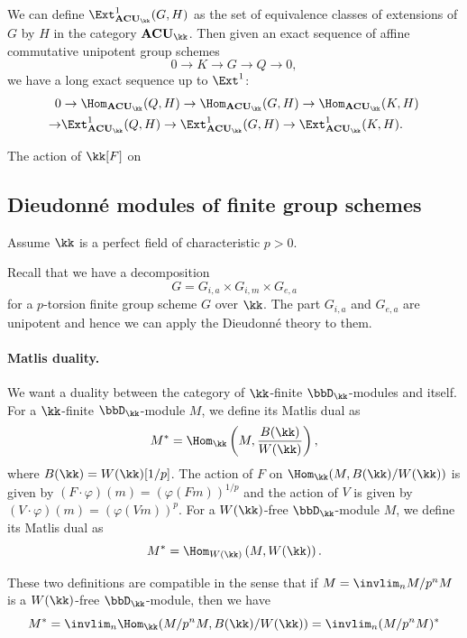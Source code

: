 \begin{remark}\label{rmk:define-Ext1}
	We can define $\Ext^1_{\mathbf{ACU}_\kk}(G, H)$ as the set of equivalence classes of extensions of $G$ by $H$ in the category $\mathbf{ACU}_\kk$.
	Then given an exact sequence of affine commutative unipotent group schemes
	\[ 0 \to K \to G \to Q \to 0, \]
	we have a long exact sequence up to $\Ext^1$:
	\begin{align*}
		0   & \to \Hom_{\mathbf{ACU}_\kk}(Q, H) \to \Hom_{\mathbf{ACU}_\kk}(G, H) \to \Hom_{\mathbf{ACU}_\kk}(K, H)    \\
		\to & \Ext^1_{\mathbf{ACU}_\kk}(Q, H) \to \Ext^1_{\mathbf{ACU}_\kk}(G, H) \to \Ext^1_{\mathbf{ACU}_\kk}(K, H).
	\end{align*}
\end{remark}

\begin{lemma}
	The action of $\kk[F]$ on \Yang{}
\end{lemma}



\subsection{Dieudonn\'e modules of finite group schemes}

Assume $\kk$ is a perfect field of characteristic $p>0$.

Recall that we have a decomposition
\[ G = G_{i,a} \times G_{i,m} \times G_{e,a} \]
for a $p$-torsion finite group scheme $G$ over $\kk$.
The part $G_{i,a}$ and $G_{e,a}$ are unipotent and hence we can apply the Dieudonn\'e theory to them.

\paragraph{Matlis duality.}
We want a duality between the category of $\kk$-finite $\bbD_\kk$-modules and itself.
For a $\kk$-finite $\bbD_\kk$-module $M$, we define its Matlis dual as
\[ M^* =  \Hom_\kk\left(M, \frac{B(\kk)}{W(\kk)}\right), \]
where $B(\kk) = W(\kk)[1/p]$.
The action of $F$ on $\Hom_\kk(M, B(\kk)/W(\kk))$ is given by $(F \cdot \varphi)(m) = \left( \varphi(Fm) \right)^{1/p}$ and the action of $V$ is given by $(V \cdot \varphi)(m) = \left( \varphi(Vm) \right)^p$.
For a $W(\kk)$-free $\bbD_\kk$-module $M$, we define its Matlis dual as
\[ M^* =  \Hom_{W(\kk)}\left(M, W(\kk)\right). \]

These two definitions are compatible in the sense that if $M = \invlim_n M/p^n M$ is a $W(\kk)$-free $\bbD_\kk$-module, then we have
\[ M^* = \invlim_n \Hom_\kk(M/p^n M, B(\kk)/W(\kk)) = \invlim_n (M/p^n M)^* \]

